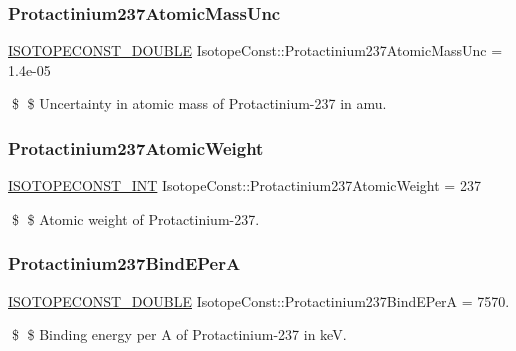 \subsubsection{\texorpdfstring{Protactinium237\+Atomic\+Mass\+Unc}{Protactinium237AtomicMassUnc}}
{\footnotesize\ttfamily \mbox{\hyperlink{group___isotope_const-_macros_ga8f45a7272ce02c0b4c65c44636ed719a}{I\+S\+O\+T\+O\+P\+E\+C\+O\+N\+S\+T\+\_\+\+D\+O\+U\+B\+LE}} Isotope\+Const\+::\+Protactinium237\+Atomic\+Mass\+Unc = 1.\+4e-\/05}

\$ \$ Uncertainty in atomic mass of Protactinium-\/237 in amu. \mbox{\label{group___isotope_const-_protactinium-_pa237_gaaf44a6f897f86fed1123d364ad42f254}} 
\subsubsection{\texorpdfstring{Protactinium237\+Atomic\+Weight}{Protactinium237AtomicWeight}}
{\footnotesize\ttfamily \mbox{\hyperlink{group___isotope_const-_macros_ga5f18360b3e99483a35c32d789e62621c}{I\+S\+O\+T\+O\+P\+E\+C\+O\+N\+S\+T\+\_\+\+I\+NT}} Isotope\+Const\+::\+Protactinium237\+Atomic\+Weight = 237}

\$ \$ Atomic weight of Protactinium-\/237. \mbox{\label{group___isotope_const-_protactinium-_pa237_ga5c912fd89417642f30f26b8b2314eb62}} 
\subsubsection{\texorpdfstring{Protactinium237\+Bind\+E\+PerA}{Protactinium237BindEPerA}}
{\footnotesize\ttfamily \mbox{\hyperlink{group___isotope_const-_macros_ga8f45a7272ce02c0b4c65c44636ed719a}{I\+S\+O\+T\+O\+P\+E\+C\+O\+N\+S\+T\+\_\+\+D\+O\+U\+B\+LE}} Isotope\+Const\+::\+Protactinium237\+Bind\+E\+PerA = 7570.}

\$ \$ Binding energy per A of Protactinium-\/237 in keV. \mbox{\label{group___isotope_const-_protactinium-_pa237_gaffad63daaf5d28bf0869fcb511ea54ff}} 
